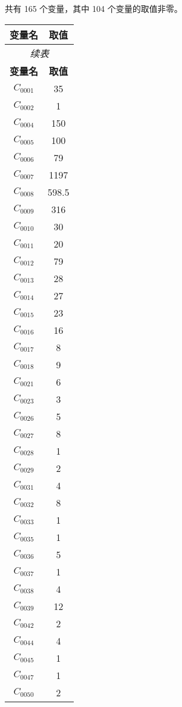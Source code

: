 \documentclass[a4paper,10pt]{article}
\begin{document}
共有 165 个变量，其中 104 个变量的取值非零。

\begin{center}
\begin{longtable}{cc}
\toprule
\textbf{变量名} & \textbf{取值} \\
\midrule
\endfirsthead
\multicolumn{2}{c}{\textit{续表}} \\
\toprule
\textbf{变量名} & \textbf{取值} \\
\midrule
\endhead
\bottomrule
\endfoot
\bottomrule
\endlastfoot
$C_{0001}$ & 35 \\
$C_{0002}$ & 1 \\
$C_{0004}$ & 150 \\
$C_{0005}$ & 100 \\
$C_{0006}$ & 79 \\
$C_{0007}$ & 1197 \\
$C_{0008}$ & 598.5 \\
$C_{0009}$ & 316 \\
$C_{0010}$ & 30 \\
$C_{0011}$ & 20 \\
$C_{0012}$ & 79 \\
$C_{0013}$ & 28 \\
$C_{0014}$ & 27 \\
$C_{0015}$ & 23 \\
$C_{0016}$ & 16 \\
$C_{0017}$ & 8 \\
$C_{0018}$ & 9 \\
$C_{0021}$ & 6 \\
$C_{0023}$ & 3 \\
$C_{0026}$ & 5 \\
$C_{0027}$ & 8 \\
$C_{0028}$ & 1 \\
$C_{0029}$ & 2 \\
$C_{0031}$ & 4 \\
$C_{0032}$ & 8 \\
$C_{0033}$ & 1 \\
$C_{0035}$ & 1 \\
$C_{0036}$ & 5 \\
$C_{0037}$ & 1 \\
$C_{0038}$ & 4 \\
$C_{0039}$ & 12 \\
$C_{0042}$ & 2 \\
$C_{0044}$ & 4 \\
$C_{0045}$ & 1 \\
$C_{0047}$ & 1 \\
$C_{0050}$ & 2 \\

\end{longtable}
\end{center}
\end{document}
